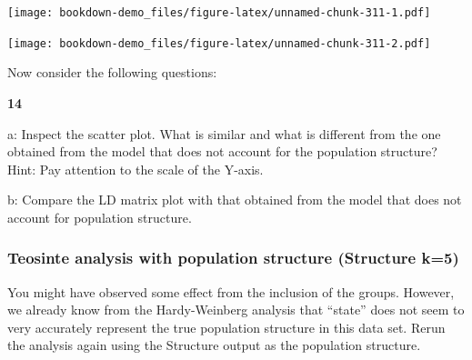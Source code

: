 \documentclass[
]{book}
\makeatletter
\newenvironment{Shaded}{\begin{snugshade}}{\end{snugshade}}
\newcommand{\AttributeTok}[1]{\textcolor[rgb]{0.77,0.63,0.00}{#1}}
\newcommand{\DecValTok}[1]{\textcolor[rgb]{0.00,0.00,0.81}{#1}}
\newcommand{\FloatTok}[1]{\textcolor[rgb]{0.00,0.00,0.81}{#1}}
\newcommand{\FunctionTok}[1]{\textcolor[rgb]{0.00,0.00,0.00}{#1}}
\newcommand{\NormalTok}[1]{#1}
\newcommand{\OtherTok}[1]{\textcolor[rgb]{0.56,0.35,0.01}{#1}}
\newcommand{\SpecialCharTok}[1]{\textcolor[rgb]{0.00,0.00,0.00}{#1}}
\newcommand{\StringTok}[1]{\textcolor[rgb]{0.31,0.60,0.02}{#1}}
\newenvironment{kframe}{%
\medskip{}
\setlength{\fboxsep}{.8em}
 \def\at@end@of@kframe{}%
 \ifinner\ifhmode%
  \def\at@end@of@kframe{\end{minipage}}%
  \begin{minipage}{\columnwidth}%
 \fi\fi%
 \def\FrameCommand##1{\hskip\@totalleftmargin \hskip-\fboxsep
 \colorbox{shadecolor}{##1}\hskip-\fboxsep
     \hskip-\linewidth \hskip-\@totalleftmargin \hskip\columnwidth}%
 \MakeFramed {\advance\hsize-\width
   \@totalleftmargin\z@ \linewidth\hsize
   \@setminipage}}%
 {\par\unskip\endMakeFramed%
 \at@end@of@kframe}
\newenvironment{rmdblock}[1]
  {
  \begin{itemize}
  \renewcommand{\labelitemi}{
    \raisebox{-.7\height}[0pt][0pt]{
      {\setkeys{Gin}{width=3em,keepaspectratio}\texttt{[image: images/\#1]}}
    }
  }
  \setlength{\fboxsep}{1em}
  \begin{kframe}
  \item
  }
  {
  \end{kframe}
  \end{itemize}
  }
\newenvironment{rmdquiz}
  {\begin{rmdblock}{quiz}}
  {\end{rmdblock}}
\makeatother
\begin{document}
\texttt{[image: bookdown-demo\_files/figure-latex/unnamed-chunk-311-1.pdf]}

\begin{Shaded}
\end{Shaded}

\texttt{[image: bookdown-demo\_files/figure-latex/unnamed-chunk-311-2.pdf]}

Now consider the following questions:

\begin{rmdquiz}
\textbf{14}

a: Inspect the scatter plot. What is similar and what is different from the one obtained from the model that does not account for the population structure? Hint: Pay attention to the scale of the Y-axis.

b: Compare the LD matrix plot with that obtained from the model that does not account for population structure.
\end{rmdquiz}

\hypertarget{teosinte-analysis-with-population-structure-structure-k5}{%
\subsubsection{Teosinte analysis with population structure (Structure k=5)}\label{teosinte-analysis-with-population-structure-structure-k5}}

You might have observed some effect from the inclusion of the groups. However, we already know from the Hardy-Weinberg analysis that ``state'' does not seem to very accurately represent the true population structure in this data set. Rerun the analysis again using the Structure output as the population structure.
\end{document}
